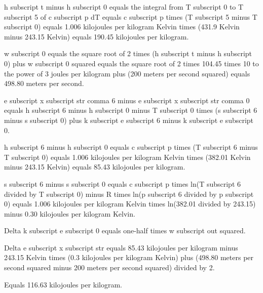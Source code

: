 h subscript t minus h subscript 0 equals the integral from T subscript 0 to T subscript 5 of c subscript p dT equals c subscript p times (T subscript 5 minus T subscript 0) equals 1.006 kilojoules per kilogram Kelvin times (431.9 Kelvin minus 243.15 Kelvin) equals 190.45 kilojoules per kilogram.  

w subscript 0 equals the square root of 2 times (h subscript t minus h subscript 0) plus w subscript 0 squared equals the square root of 2 times 104.45 times 10 to the power of 3 joules per kilogram plus (200 meters per second squared) equals 498.80 meters per second.  

e subscript x subscript str comma 6 minus e subscript x subscript str comma 0 equals h subscript 6 minus h subscript 0 minus T subscript 0 times (s subscript 6 minus s subscript 0) plus k subscript e subscript 6 minus k subscript e subscript 0.  

h subscript 6 minus h subscript 0 equals c subscript p times (T subscript 6 minus T subscript 0) equals 1.006 kilojoules per kilogram Kelvin times (382.01 Kelvin minus 243.15 Kelvin) equals 85.43 kilojoules per kilogram.  

s subscript 6 minus s subscript 0 equals c subscript p times ln(T subscript 6 divided by T subscript 0) minus R times ln(p subscript 6 divided by p subscript 0) equals 1.006 kilojoules per kilogram Kelvin times ln(382.01 divided by 243.15) minus 0.30 kilojoules per kilogram Kelvin.  

Delta k subscript e subscript 0 equals one-half times w subscript out squared.  

Delta e subscript x subscript str equals 85.43 kilojoules per kilogram minus 243.15 Kelvin times (0.3 kilojoules per kilogram Kelvin) plus (498.80 meters per second squared minus 200 meters per second squared) divided by 2.  

Equals 116.63 kilojoules per kilogram.